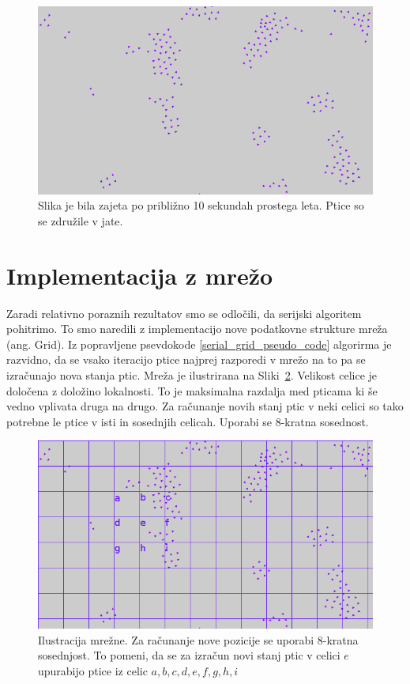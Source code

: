 \documentclass[a4paper, 12pt]{book}
\begin{document}
\begin{figure}[t]
\includegraphics[width=\textwidth]{flocking_simulation_demo}
\caption{Slika je bila zajeta po približno 10 sekundah prostega leta. Ptice so se združile v jate.}
\label{img:flocking_simulation_demo}
\centering
\end{figure}

\section{Implementacija z mrežo}
Zaradi relativno poraznih rezultatov smo se odločili, da serijski algoritem pohitrimo. To smo naredili z implementacijo nove podatkovne strukture mreža (ang. Grid). Iz popravljene psevdokode \ref{serial_grid_pseudo_code} algorirma je razvidno, da se vsako iteracijo ptice najprej razporedi v mrežo na to pa se izračunajo nova stanja ptic. Mreža je ilustrirana na Sliki~\ref{img:flocking_simulation_grid}. Velikost celice je določena z doložino lokalnosti. To je maksimalna razdalja med pticama ki še vedno vplivata druga na drugo. Za računanje novih stanj ptic v neki celici so tako potrebne le ptice v isti in sosednjih celicah. Uporabi se 8-kratna sosednost.

\begin{figure}[t]
\includegraphics[width=\textwidth]{flocking_simulation_grid}
\caption{Ilustracija mrežne. Za računanje nove pozicije se uporabi 8-kratna sosednjost. To pomeni, da se za izračun novi stanj ptic v celici $e$ upurabijo ptice iz celic $a, b, c, d, e, f, g, h, i$}
\label{img:flocking_simulation_grid}
\centering
\end{figure}
\end{document}
